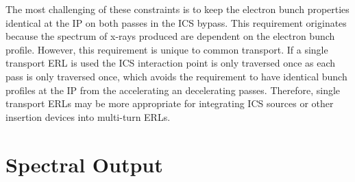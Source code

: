 \documentclass[../main.tex]{subfiles}
\begin{document}
The most challenging of these constraints is to keep the electron bunch properties identical at the IP on both passes in the ICS bypass. This requirement originates because the spectrum of x-rays produced are dependent on the electron bunch profile. However, this requirement is unique to common transport. If a single transport ERL is used the ICS interaction point is only traversed once as each pass is only traversed once, which avoids the requirement to have identical bunch profiles at the IP from the accelerating an decelerating passes. Therefore, single transport ERLs may be more appropriate for integrating ICS sources or other insertion devices into multi-turn ERLs. 

\section{Spectral Output}
\label{sec:CBETA_spectral_output}
\end{document}
